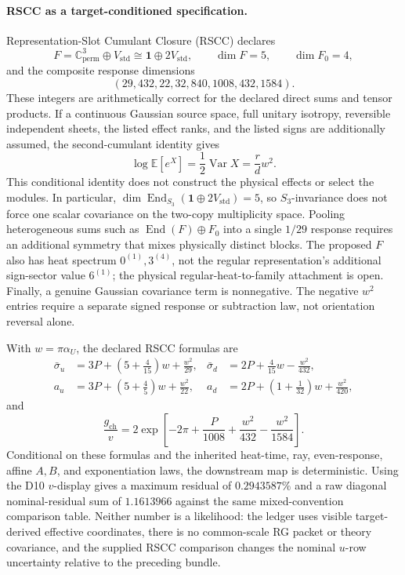 \documentclass[11pt]{article}
\begin{document}
\paragraph{RSCC as a target-conditioned specification.}
Representation-Slot Cumulant Closure (RSCC) declares
\[
F=\mathbb C^3_{\mathrm{perm}}\oplus V_{\mathrm{std}}
\cong\mathbf1\oplus2V_{\mathrm{std}},
\qquad \dim F=5,
\qquad \dim F_0=4,
\]
and the composite response dimensions
\[
(29,432,22,32,840,1008,432,1584).
\]
These integers are arithmetically correct for the declared direct sums and tensor products.  If a
continuous Gaussian source space, full unitary isotropy, reversible independent sheets, the listed
effect ranks, and the listed signs are additionally assumed, the second-cumulant identity gives
\[
\log\mathbb E[e^X]=\frac12\operatorname{Var}X
=\frac{r}{d}w^2.
\]
This conditional identity does not construct the physical effects or select the modules.
In particular,
\(\dim\operatorname{End}_{S_3}(\mathbf1\oplus2V_{\mathrm{std}})=5\), so
\(S_3\)-invariance does not force one scalar covariance on the two-copy multiplicity space.
Pooling heterogeneous sums such as \(\operatorname{End}(F)\oplus F_0\) into a single
\(1/29\) response requires an additional symmetry that mixes physically distinct blocks.
The proposed \(F\) also has heat spectrum \(0^{(1)},3^{(4)}\), not the regular representation's
additional sign-sector value \(6^{(1)}\); the physical regular-heat-to-family attachment is open.
Finally, a genuine Gaussian covariance term is nonnegative.  The negative \(w^2\) entries require a
separate signed response or subtraction law, not orientation reversal alone.

With \(w=\pi\alpha_U\), the declared RSCC formulas are
\[
\begin{aligned}
\bar\sigma_u&=3P+\left(5+\frac4{15}\right)w+\frac{w^2}{29},&
\bar\sigma_d&=2P+\frac4{15}w-\frac{w^2}{432},\\
a_u&=3P+\left(5+\frac45\right)w+\frac{w^2}{22},&
a_d&=2P+\left(1+\frac1{32}\right)w+\frac{w^2}{420},
\end{aligned}
\]
and
\[
\frac{g_{\mathrm{ch}}}{v}
=2\exp\!\left[-2\pi+\frac{P}{1008}
+\frac{w^2}{432}-\frac{w^2}{1584}\right].
\]
Conditional on these formulas and the inherited heat-time, ray, even-response, affine \(A,B\),
and exponentiation laws, the downstream map is deterministic.  Using the D10
\(v\)-display gives a maximum residual of \(0.2943587\%\) and a raw diagonal nominal-residual sum
of \(1.1613966\) against the same mixed-convention comparison table.  Neither number is a
likelihood: the ledger uses visible target-derived effective coordinates,
there is no common-scale RG packet or theory covariance, and the supplied RSCC comparison changes
the nominal \(u\)-row uncertainty relative to the preceding bundle.
\end{document}
